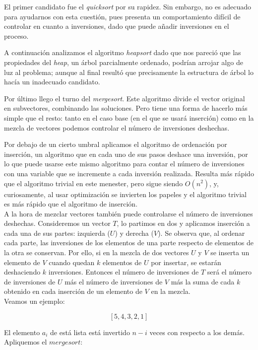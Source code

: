 El primer candidato fue el \textit{quicksort} por su rapidez. Sin embargo, no es adecuado para ayudarnos con esta cuestión, pues presenta un comportamiento difícil de controlar en cuanto a inversiones, dado que puede añadir inversiones en el proceso.

A continuación analizamos el algoritmo \textit{heapsort} dado que nos pareció que las propiedades del \textit{heap}, un árbol parcialmente ordenado, podrían arrojar algo de luz al problema; aunque al final resultó que precisamente la estructura de árbol lo hacía un inadecuado candidato.

Por último llego el turno del \textit{mergesort}. Este algoritmo divide el vector original en subvectores, combinando las soluciones. Pero tiene una forma de hacerlo más simple que el resto: tanto en el caso base (en el que se usará inserción) como en la mezcla de vectores podemos controlar el número de inversiones deshechas.

Por debajo de un cierto umbral aplicamos el algoritmo de ordenación por inserción, un algoritmo que en cada uno de sus pasos deshace una inversión, por lo que puede usarse este mismo algoritmo para contar el número de inversiones con una variable que se incremente a cada inversión realizada. Resulta más rápido que el algoritmo trivial en este menester, pero sigue siendo $O(n^2)$, y, curiosamente, al usar optimización se invierten los papeles y el algoritmo trivial es más rápido que el algoritmo de inserción. \\

A la hora de mezclar vectores también puede controlarse el número de inversiones deshechas. Consideremos un vector $T$, lo partimos en dos y aplicamos inserción a cada una de sus partes: izquierda ($U$) y derecha ($V$). Se observa que, al ordenar cada parte, las inversiones de los elementos de una parte respecto de elementos de la otra se conservan. Por ello, si en la mezcla de dos vectores $U$ y $V$ se inserta un elemento de $V$ cuando quedan $k$ elementos de $U$ por insertar, se estarán deshaciendo $k$ inversiones. Entonces el número de inversiones de $T$ será el número de inversiones de $U$ más el número de inversiones de $V$ más la suma de cada $k$ obtenido en cada inserción de un elemento de $V$ en la mezcla.\\

Veamos un ejemplo:

\[[5,4,3,2,1]\]

El elemento $a_i$ de está lista está invertido $n-i$ veces con respecto a los demás. Apliquemos el $mergesort$:

